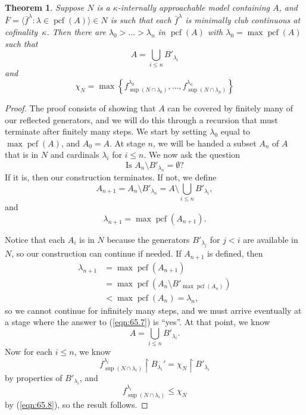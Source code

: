 \documentclass[10pt]{amsart}
\theoremstyle{plain}
\newtheorem{theorem}{Theorem}
\theoremstyle{definition}
\theoremstyle{remark}
\DeclareMathOperator{\pcf}{pcf}
\numberwithin{equation}{section}
\begin{document}
\begin{theorem}
Suppose $N$ is a $\kappa$-internally approachable model containing $A$, and $\bar{F}=\langle \bar{f}^\lambda:\lambda\in\pcf(A)\rangle\in N$
is such that each $\bar{f}^\lambda$ is minimally club continuous at cofinality~$\kappa$. Then
there are $\lambda_0>\dots>\lambda_n$ in $\pcf(A)$ with $\lambda_0=\max\pcf(A)$ such that
\begin{equation}
A = \bigcup_{i\leq n}B'_{\lambda_i}
\end{equation}
and
\begin{equation}
\chi_N = \max\left\{f^{\lambda_0}_{\sup(N\cap\lambda_0)},\dots, f^{\lambda_n}_{\sup(N\cap\lambda_n)}\right\}
\end{equation}
\end{theorem}
\begin{proof}
The proof consists of showing that $A$ can be covered by finitely many of our reflected generators, and we will do this through
a recursion that must terminate after finitely many steps.
We start by setting
$\lambda_0$ equal to $\max\pcf(A)$, and $A_0 = A$.  At stage $n$, we will be handed a subset $A_n$ of $A$ that is in $N$
and cardinals $\lambda_i$ for $i\leq n$.  We now ask the question
\begin{equation}
\label{eqn:65.7}
\text{Is }A_n\setminus B'_{\lambda_n}=\emptyset?
\end{equation}
If it is, then our construction terminates. If not, we define
\begin{equation}
A_{n+1} = A_n\setminus B'_{\lambda_n} = A\setminus\bigcup_{i\leq n}B'_{\lambda_i},
\end{equation}
and
\begin{equation}
\lambda_{n+1} = \max\pcf(A_{n+1}).
\end{equation}

Notice that each $A_i$ is in $N$ because the generators $B'_{\lambda_j}$ for $j<i$ are available in $N$, so our construction can
continue if needed.  If $A_{n+1}$ is defined,
then
\begin{equation}
\begin{aligned}
\lambda_{n+1} &= \max\pcf(A_{n+1})\\
&=\max\pcf(A_n\setminus B'_{\max\pcf(A_n)})\\
&<\max\pcf(A_n)=\lambda_n,
\end{aligned}
\end{equation}
so we cannot continue for infinitely many steps, and we must arrive eventually at a stage where the answer to (\ref{eqn:65.7}) is ``yes''.
At that point, we know
\begin{equation}
A = \bigcup_{i\leq n}B'_{\lambda_i}.
\end{equation}
Now for each $i\leq n$, we know
\begin{equation}
f^{\lambda_i}_{\sup(N\cap\lambda_i)}\restriction B_{\lambda_i}' = \chi_N\restriction B'_{\lambda_i}
\end{equation}
by properties of $B'_{\lambda_i}$, and
\begin{equation}
f^{\lambda_i}_{\sup(N\cap\lambda_i)}\leq \chi_N
\end{equation}
by (\ref{eqn:65.8}), so the result follows.
\end{proof}
\end{document}
